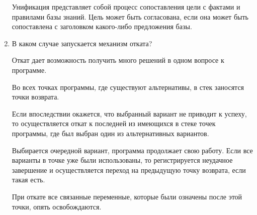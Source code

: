 \documentclass[a4paper,14pt]{extreport} %
\begin{document}
\begin{enumerate}
Унификация представляет собой процесс сопоставления цели с фактами и правилами базы знаний. Цель может быть согласована, если она может быть сопоставлена с заголовком какого-либо предложения базы.

\item В каком случае запускается механизм отката?

Откат дает возможность получить много решений в одном вопросе к программе. 

Во всех точках программы, где существуют альтернативы, в стек заносятся точки возврата. 

Если впоследствии окажется, что выбранный вариант не приводит к успеху, то осуществляется откат к последней из имеющихся в стеке точек программы, где был выбран один из альтернативных вариантов. 

Выбирается очередной вариант, программа продолжает свою работу. Если все варианты в точке уже были использованы, то регистрируется неудачное завершение и осуществляется переход на предыдущую точку возврата, если такая есть. 

При откате все связанные переменные, которые были означены после этой точки, опять освобождаются.

 \end{enumerate}
 
\end{document}
